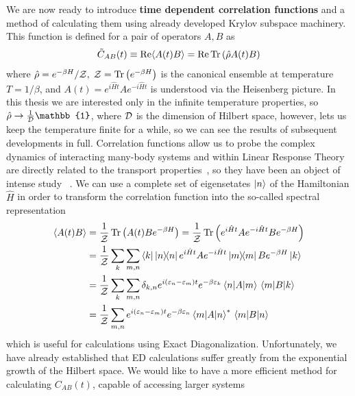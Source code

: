 We are now ready to introduce \textbf{time dependent correlation functions} and a method of calculating them using already
developed Krylov subspace machinery. This function is defined for a pair of operators \(A, B\) as
\begin{equation}
\tilde{C}_{AB}(t) \equiv \Re \langle A(t) B \rangle = \Re \Tr\left(\hat{\rho}A(t)B\right)
\end{equation}
where \(\hat{\rho} = e^{-\beta H}/\mathcal{Z},\; \mathcal{Z} = \Tr\left(e^{-\beta H}\right)\) is the canonical ensemble at temperature \(T = 1/\beta\),
and \(A(t) = e^{i \hat{H} t} A e^{-i \hat{H} t}\) is understood via the Heisenberg picture. In this thesis we are
interested only in the infinite temperature properties, so \(\hat{\rho} \to \frac{1}{\dimension} \mathbb{1}\), where \(\mathcal{D}\) is 
the dimension of Hilbert space, however, lets us keep the temperature finite for a while, so we can see the results of subsequent
developments in full. Correlation functions allow us to probe the complex dynamics of interacting many-body
systems and within Linear Response Theory are directly related to the transport properties~\autocite{Mahan2000}, so
they have been an object of intense study
~\autocite{Steinigeweg2014,Sirker2009,Steinigeweg2009,Karrasch2013a,Karrasch2012,Steinigeweg2015,Richter2019}.
We can use a complete set of eigensetates \(\ket{n}\) of the Hamiltonian \(\hat{H}\) in order to transform
the correlation function into the so-called spectral representation
\begin{align}
	\langle A(t) B \rangle &=  \frac{1}{\mathcal{Z}}\Tr\left(A(t)B e^{-\beta H}\right) = \frac{1}{\mathcal{Z}}\Tr\left(e^{i \hat{H} t} A e^{-i \hat{H} t}B e^{-\beta H}\right)\nonumber\\
	&= \frac{1}{\mathcal{Z}} \sum_k \sum_{m,n} \bra{k} \ketbra{n}{n} e^{i \hat{H} t} A e^{-i \hat{H} t} \ketbra{m}{m} B e^{-\beta H} \ket{k}  \nonumber \\
	&= \frac{1}{\mathcal{Z}} \sum_k \sum_{m,n} \delta_{k,n} e^{i (\varepsilon_n  - \varepsilon_m) t} e^{-\beta \varepsilon_k} \matrixel{n}{A}{m} \matrixel{m}{B}{k} \nonumber \\
	&= \frac{1}{\mathcal{Z}} \sum_{m,n} e^{i (\varepsilon_n  - \varepsilon_m) t} e^{-\beta \varepsilon_n}\matrixel{m}{A}{n}^{\ast} \matrixel{m}{B}{n}
\end{align}
which is useful for calculations using Exact Diagonalization. Unfortunately, we have already established that ED calculations
suffer greatly from the exponential growth of the Hilbert space.
We would like to have a more efficient method for calculating \(C_{AB}(t)\), capable of accessing larger systems
